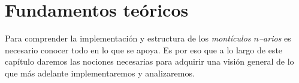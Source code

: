 \chapter{Fundamentos teóricos}
Para comprender la implementación y estructura de los \textit{montículos $n$--arios} es necesario conocer todo en lo que se apoya. Es por eso que a lo largo de este capítulo daremos las nociones necesarias para adquirir una visión general de lo que más adelante implementaremos y analizaremos.


